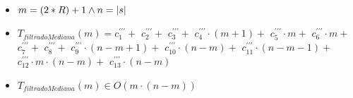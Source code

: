 \documentclass{article}
\begin{document}
    \begin{itemize}
        \item $m = (2*R) + 1 \wedge n = |s|$
        \item $T_{filtradoMediana}(m) = c^{\prime\prime\prime}_1+                       $
                                       $c^{\prime\prime\prime}_2+                       $
                                       $c^{\prime\prime\prime}_3+                       $
                                       $c^{\prime\prime\prime}_4 \cdot (m+1)+           $
                                       $c^{\prime\prime\prime}_5 \cdot m+               $
                                       $c^{\prime\prime\prime}_6 \cdot m+               $
                                       $c^{\prime\prime\prime}_7+                       $
                                       $c^{\prime\prime\prime}_8+                       $
                                       $c^{\prime\prime\prime}_9 \cdot (n-m+1)+         $
                                       $c^{\prime\prime\prime}_{10} \cdot (n-m)+        $
                                       $c^{\prime\prime\prime}_{11} \cdot (n-m-1)+      $
                                       $c^{\prime\prime\prime}_{12} \cdot m \cdot (n-m)+$
                                       $c^{\prime\prime\prime}_{13} \cdot (n-m)         $
        \item $T_{filtradoMediana}(m) \in O(m \cdot (n-m))$
    \end{itemize}
\end{document}
